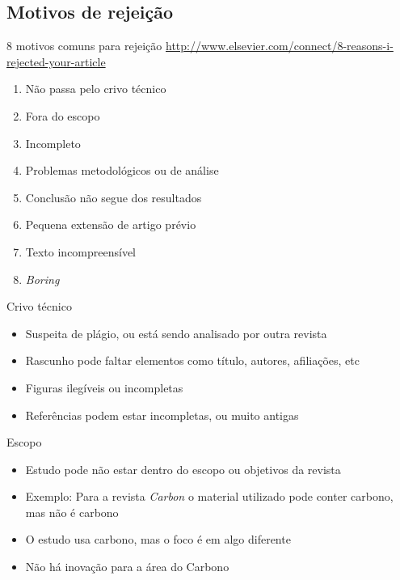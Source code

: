 \documentclass{beamer}
\begin{document}
\subsection{Motivos de rejeição}

\begin{frame}{8 motivos comuns para rejeição}
  \url{http://www.elsevier.com/connect/8-reasons-i-rejected-your-article}
  \begin{enumerate}
  \item<1-> Não passa pelo crivo técnico
  \item<1-> Fora do escopo
  \item<1-> Incompleto
  \item<1-> Problemas metodológicos ou de análise
  \item<1-> Conclusão não segue dos resultados
  \item<1-> Pequena extensão de artigo prévio
  \item<1-> Texto incompreensível
  \item<1-> {\em Boring}
  \end{enumerate}
\end{frame}

\begin{frame}{Crivo técnico}
  \begin{itemize}
  \item Suspeita de plágio, ou está sendo analisado por outra revista
  \item Rascunho pode faltar elementos como título, autores,
    afiliações, etc
  \item Figuras ilegíveis ou incompletas
  \item Referências podem estar incompletas, ou muito antigas
  \end{itemize}
\end{frame}

\begin{frame}{Escopo}
  \begin{itemize}
  \item Estudo pode não estar dentro do escopo ou objetivos da revista
  \item Exemplo: Para a revista {\em Carbon} o material utilizado pode
    conter carbono, mas não é carbono
  \item O estudo usa carbono, mas o foco é em algo diferente
  \item Não há inovação para a área do Carbono
  \end{itemize}
\end{frame}
\end{document}
